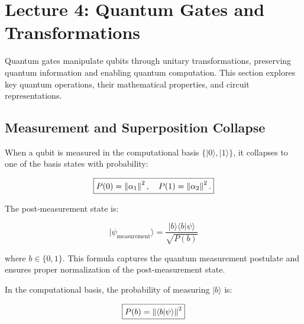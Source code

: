 \section{Lecture 4: Quantum Gates and Transformations}\label{sec:lecture4}

Quantum gates manipulate qubits through unitary transformations, preserving
quantum information and enabling quantum computation. This section explores
key quantum operations, their mathematical properties, and circuit
representations.


\subsection*{Measurement and Superposition Collapse}

When a qubit is measured in the computational basis $\{|0\rangle,
|1\rangle\}$, it collapses to one of the basis states with probability:

\[
  \boxed{
    P(0) = \left\lVert\alpha_1\right\rVert^2, \quad P(1) = \left\lVert\alpha_2\right\rVert^2.
  }
\]

The post-measurement state is:

\[
  \boxed{
    |\psi_{\text{measurement}}\rangle = \frac{|b\rangle \langle b | \psi
    \rangle}{\sqrt{P(b)}}
  }
\]

\noindent
where $b \in \{0,1\}$. This formula captures the quantum measurement
postulate and ensures proper normalization of the post-measurement state.

\vspace{0.3cm}

In the computational basis, the probability of measuring $|b\rangle$ is:


\[
  \boxed{
    P(b) = \left\lVert\langle b | \psi \rangle\right\rVert^2
  }
\]



